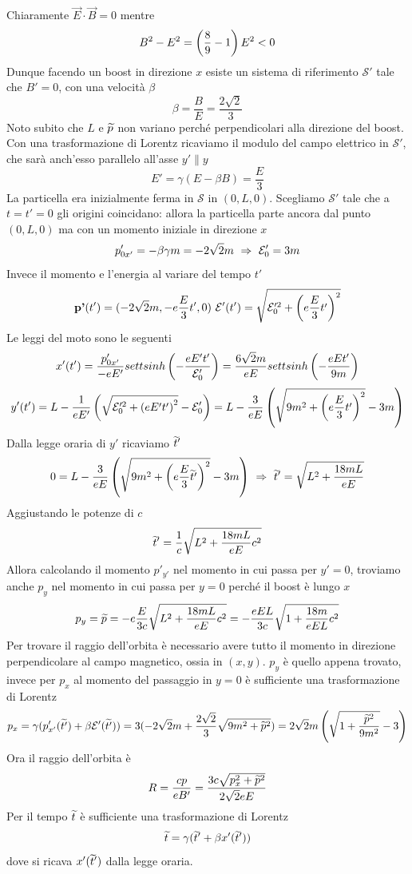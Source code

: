 \documentclass[12pt,twoside,a4]{article}
\begin{document}
\begin{solution}
Chiaramente $\vec{E} \cdot \vec{B} = 0$ mentre
$$ B^2 - E^2 = \left({\frac{8}{9} - 1}\right)E^2 < 0$$
Dunque facendo un boost in direzione $x$ esiste un sistema di riferimento $\mathcal{S}'$ tale che $B' =0$, con una velocità  $\beta$
$$ \beta = \frac{B}{E} = \frac{2 \sqrt{2}}{3}$$
Noto subito che $L$ e $\widetilde{p}$ non variano perché perpendicolari alla direzione del boost. Con una trasformazione di Lorentz ricaviamo il modulo del campo elettrico in $\mathcal{S}'$, che sarà  anch'esso parallelo all'asse $y' \parallel y$
$$ E' = \gamma (E - \beta B) = \frac{E}{3} $$
La particella era inizialmente ferma in $\mathcal{S}$ in $(0,L,0)$. Scegliamo $\mathcal{S}'$ tale che a $t = t' = 0$ gli origini coincidano: allora la particella parte ancora dal punto $(0,L,0)$ ma con un momento iniziale in direzione $x$ 
$$ p'_{0x'} = -\beta \gamma m = -2 \sqrt{2} m  \  \Rightarrow  \  \mathcal{E}'_0 = 3m $$
Invece il momento e l'energia al variare del tempo $t'$
$$ \textbf{p'}(t') = (-2 \sqrt{2} m, - e \frac{E}{3}t',0)  \  \mathcal{E}'(t') = \sqrt{\mathcal{E}'^2_0 + \left({e \frac{E}{3}t'}\right)^2}$$
Le leggi del moto sono le seguenti
$$ x'(t') = \frac{p'_{0x'}}{-e E'} settsinh\left({-\frac{e E' t'}{\mathcal{E}'_0}}\right) =
\frac{6\sqrt{2}m}{e E} settsinh\left({-\frac{e E t'}{9m}}\right) $$
$$ y'(t') = L - \frac{1}{e E'} \left({\sqrt{\mathcal{E}'^2_0 + \left({e E' t'}\right)^2} - \mathcal{E}'_0}\right) = 
L - \frac{3}{e E} \left({\sqrt{9m^2 + \left({e \frac{E}{3} t'}\right)^2} - 3m}\right)$$
Dalla legge oraria di $y'$ ricaviamo $\widetilde{t}'$
$$ 0 = L - \frac{3}{e E} \left({\sqrt{9m^2 + \left({e \frac{E}{3} \widetilde{t}'}\right)^2} - 3m}\right)  \  \Rightarrow  \  \widetilde{t}' = \sqrt{L^2 + \frac{18mL}{eE}}$$
Aggiustando le potenze di $c$
$$ \widetilde{t}' = \frac{1}{c} \sqrt{L^2 + \frac{18mL}{eE} c^2} $$
Allora calcolando il momento $p'_{y'}$ nel momento in cui passa per $y'=0$, troviamo anche $p_y$ nel momento in cui passa per $y=0$ perché il boost è lungo $x$
$$ p_y = \widetilde{p} = - e \frac{E}{3c } \sqrt{L^2 + \frac{18mL}{eE} c^2} =  
-  \frac{eEL}{3 c} \sqrt{1+ \frac{18m}{eEL} c^2}$$ 
Per trovare il raggio dell'orbita è necessario avere tutto il momento in direzione perpendicolare al campo magnetico, ossia in $(x,y)$. $p_y$ è quello appena trovato, invece per $p_x$ al momento del passaggio in $y=0$ è sufficiente una trasformazione di Lorentz
$$ p_x = \gamma ( p'_{x'}(\widetilde{t'}) + \beta \mathcal{E}'(\widetilde{t'})) = 
 3 (- 2\sqrt{2}m + \frac{2\sqrt{2}}{3} \sqrt{9m^2 + \widetilde{p}^2}) = 
 2 \sqrt{2}m \left({ \sqrt{1 + \frac{\widetilde{p}^2}{9m^2}}-3}\right) $$
Ora il raggio dell'orbita è
$$ R = \frac{c p}{e B'} = \frac{3 c \sqrt{p_x^2 + \widetilde{p}^2}}{2 \sqrt{2} eE }$$
Per il tempo $\widetilde{t}$ è sufficiente una trasformazione di Lorentz
$$ \widetilde{t} = \gamma (\widetilde{t}' + \beta x'(\widetilde{t}'))$$
dove si ricava $x'(\widetilde{t}')$ dalla legge oraria.
\end{solution}
\end{document}
